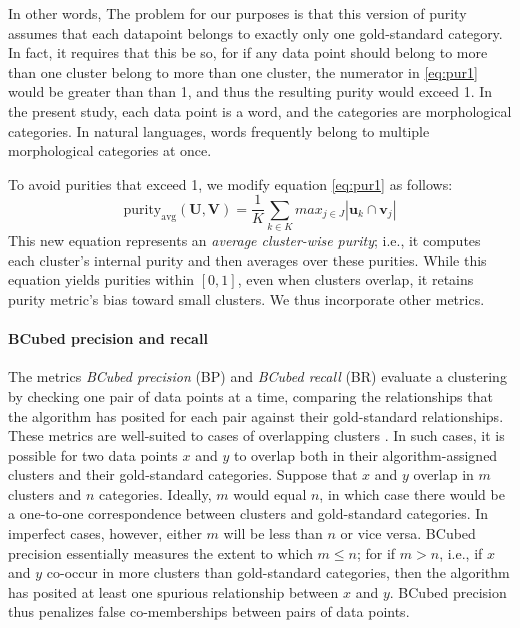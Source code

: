 In other words, 
The problem for our purposes is that this version of purity assumes that each datapoint belongs to exactly only one gold-standard category. In fact, it requires that this be so, for if any data point should belong to more than one cluster belong to more than one cluster, the numerator in \eqref{eq:pur1} would be greater than than 1, and thus the resulting purity would exceed 1.
In the present study, each data point is a word, and the categories are morphological categories. In natural languages, words frequently belong to multiple morphological categories at once.

To avoid purities that exceed 1, we modify equation \eqref{eq:pur1} as follows: 
\begin{equation} \label{eq:pur2}
\text{purity}_{\text{avg}}(\mathbf{U}, \mathbf{V}) =  \frac{1}{K} \sum_{k \in K} max_{j \in J} |\mathbf{u}_k \cap \mathbf{v}_j|
\end{equation}
This new equation represents an \emph{average cluster-wise purity}; i.e., it computes each cluster's internal purity and then averages over these purities. %
While this equation yields purities within $[0, 1]$, even 
when clusters overlap, it retains %
purity metric's bias toward small clusters. We thus incorporate other metrics. 

\paragraph{BCubed precision and recall}
The metrics \emph{BCubed precision} (BP) and \emph{BCubed recall} (BR) \citep{bagga-and-baldwin:1998} evaluate a clustering by checking one 
pair of data points at a time, comparing the relationships that the algorithm has posited for each pair against their 
gold-standard relationships. These metrics are well-suited to cases of overlapping 
clusters \citep{amigo-et-al:2009}. 
In such cases, it is possible for two data points $x$ and $y$ to overlap both in their algorithm-assigned clusters and their 
gold-standard categories. Suppose that $x$ and $y$ overlap in $m$ clusters and $n$ categories. Ideally, $m$ would 
equal $n$, in which case there would be a one-to-one correspondence between clusters and gold-standard categories. 
In imperfect cases, however, either $m$ will be less than $n$ or vice versa. BCubed precision essentially 
measures the extent to which $m \leq n$; for if $m>n$, i.e., if $x$ and $y$ co-occur in more clusters than gold-standard categories, then the algorithm has posited at least one 
spurious relationship between $x$ and $y$. BCubed precision thus penalizes false co-memberships between pairs of data points.

